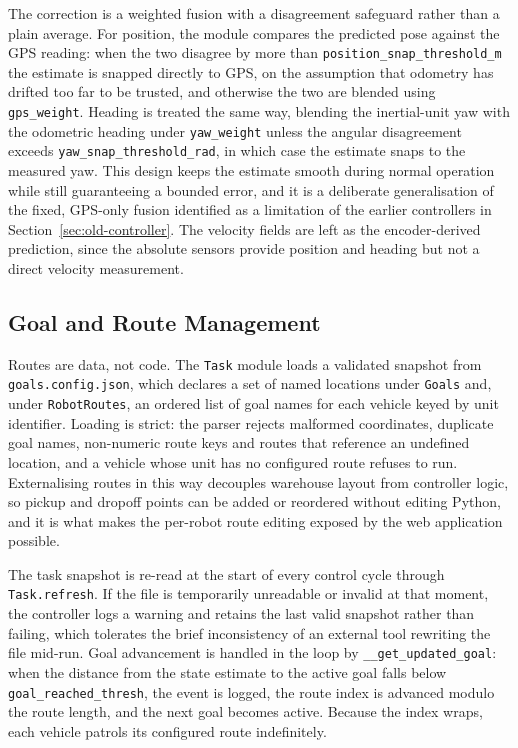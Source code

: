 The correction is a weighted fusion with a disagreement safeguard rather than a plain average. For position, the module compares the predicted pose against the GPS reading: when the two disagree by more than \texttt{position\_snap\_threshold\_m} the estimate is snapped directly to GPS, on the assumption that odometry has drifted too far to be trusted, and otherwise the two are blended using \texttt{gps\_weight}. Heading is treated the same way, blending the inertial-unit yaw with the odometric heading under \texttt{yaw\_weight} unless the angular disagreement exceeds \texttt{yaw\_snap\_threshold\_rad}, in which case the estimate snaps to the measured yaw. This design keeps the estimate smooth during normal operation while still guaranteeing a bounded error, and it is a deliberate generalisation of the fixed, GPS-only fusion identified as a limitation of the earlier controllers in Section~\ref{sec:old-controller}. The velocity fields are left as the encoder-derived prediction, since the absolute sensors provide position and heading but not a direct velocity measurement.

\subsection{Goal and Route Management}
\label{subsec:controllers-goals}

Routes are data, not code. The \texttt{Task} module loads a validated snapshot from \texttt{goals.config.json}, which declares a set of named locations under \texttt{Goals} and, under \texttt{RobotRoutes}, an ordered list of goal names for each vehicle keyed by unit identifier. Loading is strict: the parser rejects malformed coordinates, duplicate goal names, non-numeric route keys and routes that reference an undefined location, and a vehicle whose unit has no configured route refuses to run. Externalising routes in this way decouples warehouse layout from controller logic, so pickup and dropoff points can be added or reordered without editing Python, and it is what makes the per-robot route editing exposed by the web application possible.

The task snapshot is re-read at the start of every control cycle through \texttt{Task.refresh}. If the file is temporarily unreadable or invalid at that moment, the controller logs a warning and retains the last valid snapshot rather than failing, which tolerates the brief inconsistency of an external tool rewriting the file mid-run. Goal advancement is handled in the loop by \texttt{\_\_get\_updated\_goal}: when the distance from the state estimate to the active goal falls below \texttt{goal\_reached\_thresh}, the event is logged, the route index is advanced modulo the route length, and the next goal becomes active. Because the index wraps, each vehicle patrols its configured route indefinitely.

